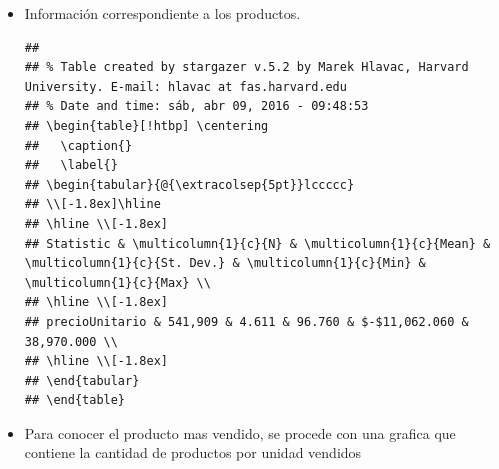 \begin{itemize}
 \item Información correspondiente a los productos.
\begin{knitrout}
\color{fgcolor}\begin{kframe}
\begin{alltt}
  \hlkwb{=} \hlstd{(} \hlopt{$}
\end{alltt}
\begin{verbatim}
## 
## % Table created by stargazer v.5.2 by Marek Hlavac, Harvard University. E-mail: hlavac at fas.harvard.edu
## % Date and time: sáb, abr 09, 2016 - 09:48:53
## \begin{table}[!htbp] \centering 
##   \caption{} 
##   \label{} 
## \begin{tabular}{@{\extracolsep{5pt}}lccccc} 
## \\[-1.8ex]\hline 
## \hline \\[-1.8ex] 
## Statistic & \multicolumn{1}{c}{N} & \multicolumn{1}{c}{Mean} & \multicolumn{1}{c}{St. Dev.} & \multicolumn{1}{c}{Min} & \multicolumn{1}{c}{Max} \\ 
## \hline \\[-1.8ex] 
## precioUnitario & 541,909 & 4.611 & 96.760 & $-$11,062.060 & 38,970.000 \\ 
## \hline \\[-1.8ex] 
## \end{tabular} 
## \end{table}
\end{verbatim}
\end{kframe}
\end{knitrout}
 
 \item Para conocer el producto mas vendido, se procede con una grafica que contiene la cantidad de productos por unidad vendidos
\begin{knitrout}
\color{fgcolor}\begin{kframe}
\begin{alltt}
\hlstd{(}   \hlopt{+} \hlstd{(}\hlstd{=}\hlstd{)} \hlopt{+} \hlstd{(}\hlstd{=}\hlstd{())}
\end{alltt}



\end{kframe}
\end{knitrout}
\end{itemize}
